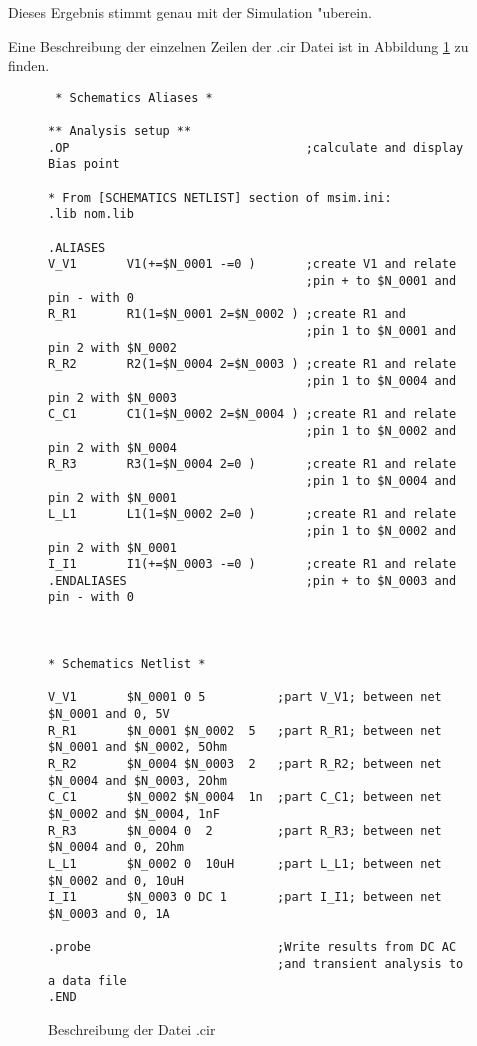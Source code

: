 Dieses Ergebnis stimmt genau mit der Simulation "uberein.


Eine Beschreibung der einzelnen Zeilen der .cir Datei ist in Abbildung \ref{fig:cir} zu finden.

\begin{figure}
\begin{verbatim}
 * Schematics Aliases *

** Analysis setup **
.OP                                 ;calculate and display Bias point

* From [SCHEMATICS NETLIST] section of msim.ini:
.lib nom.lib

.ALIASES					
V_V1       V1(+=$N_0001 -=0 )       ;create V1 and relate
                                    ;pin + to $N_0001 and pin - with 0
R_R1       R1(1=$N_0001 2=$N_0002 ) ;create R1 and
                                    ;pin 1 to $N_0001 and pin 2 with $N_0002
R_R2       R2(1=$N_0004 2=$N_0003 ) ;create R1 and relate
                                    ;pin 1 to $N_0004 and pin 2 with $N_0003
C_C1       C1(1=$N_0002 2=$N_0004 ) ;create R1 and relate
                                    ;pin 1 to $N_0002 and pin 2 with $N_0004
R_R3       R3(1=$N_0004 2=0 )       ;create R1 and relate
                                    ;pin 1 to $N_0004 and pin 2 with $N_0001
L_L1       L1(1=$N_0002 2=0 )       ;create R1 and relate
                                    ;pin 1 to $N_0002 and pin 2 with $N_0001
I_I1       I1(+=$N_0003 -=0 )       ;create R1 and relate
.ENDALIASES                         ;pin + to $N_0003 and pin - with 0



* Schematics Netlist *

V_V1       $N_0001 0 5          ;part V_V1; between net $N_0001 and 0, 5V
R_R1       $N_0001 $N_0002  5   ;part R_R1; between net $N_0001 and $N_0002, 5Ohm
R_R2       $N_0004 $N_0003  2   ;part R_R2; between net $N_0004 and $N_0003, 2Ohm
C_C1       $N_0002 $N_0004  1n  ;part C_C1; between net $N_0002 and $N_0004, 1nF
R_R3       $N_0004 0  2         ;part R_R3; between net $N_0004 and 0, 2Ohm
L_L1       $N_0002 0  10uH      ;part L_L1; between net $N_0002 and 0, 10uH
I_I1       $N_0003 0 DC 1       ;part I_I1; between net $N_0003 and 0, 1A

.probe                          ;Write results from DC AC
                                ;and transient analysis to a data file
.END
\end{verbatim}
\caption{Beschreibung der Datei .cir\label{fig:cir}}
\end{figure}

